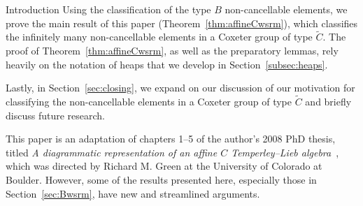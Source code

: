 \documentclass[12pt]{amsart}
\newcommand{\C}{\widetilde{C}}
\renewcommand{\(}{\left(}
\renewcommand{\)}{\right)}
\begin{document}
\begin{section}{Introduction}
Using the classification of the type $B$ non-cancellable elements, we prove the main result of this paper (Theorem~\ref{thm:affineCwsrm}), which classifies the infinitely many non-cancellable elements in a Coxeter group of type $\C$.  The proof of Theorem~\ref{thm:affineCwsrm}, as well as the preparatory lemmas, rely heavily on the notation of heaps that we develop in Section~\ref{subsec:heaps}.

Lastly, in Section~\ref{sec:closing}, we expand on our discussion of our motivation for classifying the non-cancellable elements in a Coxeter group of type $\C$ and briefly discuss future research.

This paper is an adaptation of chapters 1--5 of the author's 2008 PhD thesis, titled \textit{A diagrammatic representation of an affine $C$ Temperley--Lieb algebra}~\cite{Ernst.D:A}, which was directed by Richard M. Green at the University of Colorado at Boulder.  However, some of the results presented here, especially those in Section~\ref{sec:Bwsrm}, have new and streamlined arguments.

\end{section}

\end{document}
